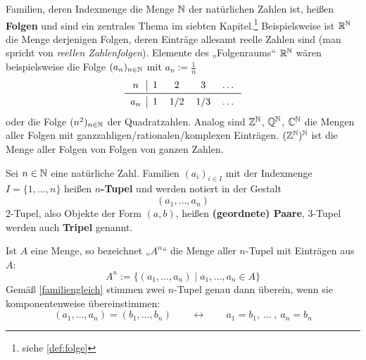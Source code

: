 \begin{bsp}[Folgen]
    Familien, deren Indexmenge die Menge $\mathbb N$ der natürlichen Zahlen ist, heißen \textbf{Folgen} und sind ein zentrales Thema im siebten Kapitel.\footnote{siehe \cref{def:folge}} Beispielsweise ist $\mathbb R^\mathbb N$ die Menge derjenigen Folgen, deren Einträge allesamt reelle Zahlen sind (man spricht von \emph{reellen Zahlenfolgen}). Elemente des „Folgenraums“ $\mathbb R^\mathbb N$ wären beispielsweise die Folge $(a_n)_{n\in\mathbb N}$ mit $a_n:=\frac{1}{n}$
    \[\begin{tabular}{c|cccc}
            $n$ & $1$ & $2$ & $3$ & $\dots$ \\
            \midrule
            $a_n$ & $1$ & $1/2$ & $1/3$ & $\dots$
    \end{tabular}\]
    oder die Folge $(n^2)_{n\in \mathbb N}$ der Quadratzahlen. Analog sind $\mathbb Z^\mathbb N$, $\mathbb Q^\mathbb N$, $\mathbb C^\mathbb N$ die Mengen aller Folgen mit ganzzahligen/rationalen/komplexen Einträgen. $(\mathbb Z^\mathbb N)^\mathbb N$ ist die Menge aller Folgen von Folgen von ganzen Zahlen.
\end{bsp}


\begin{de}[Tupel] \label{def:tupel} 
    Sei $n\in \mathbb N$ eine natürliche Zahl. Familien $(a_i)_{i\in I}$ mit der Indexmenge $I=\{1,\dots,n\}$ heißen \textbf{$n$-Tupel} und werden notiert in der Gestalt
        \[ (a_1,\dots,a_n)  \]
    2-Tupel, also Objekte der Form $(a,b)$, heißen \textbf{(geordnete) Paare}, 3-Tupel werden auch \textbf{Tripel} genannt.
    
    Ist $A$ eine Menge, so bezeichnet „$A^n$“ die Menge aller $n$-Tupel mit Einträgen aus $A$:
        \[ A^n := \{ (a_1,\dots , a_n) \mid a_1,\dots , a_n \in A \} \]
    Gemäß \cref{familiengleich} stimmen zwei $n$-Tupel genau dann überein, wenn sie komponentenweise übereinstimmen:
	\[ (a_1,\dots , a_n)=(b_1,\dots , b_n) \qquad\leftrightarrow\qquad a_1=b_1,\ \ldots\ ,\ a_n=b_n \]
\end{de}


